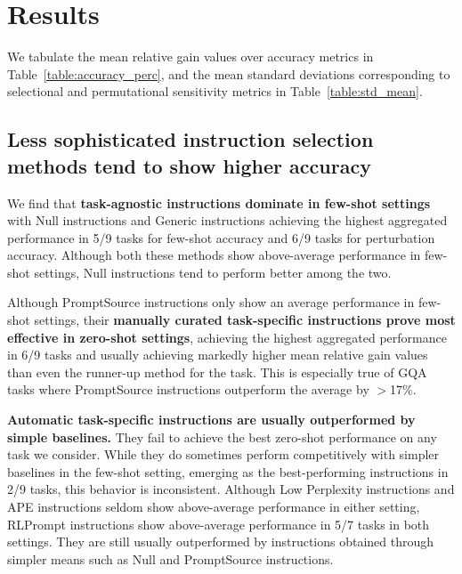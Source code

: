 \section{Results}


We tabulate the mean relative gain values over accuracy metrics in Table~\ref{table:accuracy_perc}, and the mean standard deviations corresponding to selectional and permutational sensitivity metrics in Table~\ref{table:std_mean}.

\subsection{Less sophisticated instruction selection methods tend to show higher accuracy}

We find that \textbf{task-agnostic instructions dominate in few-shot settings} with Null instructions and Generic instructions achieving the highest aggregated performance in 5/9 tasks for few-shot accuracy and 6/9 tasks for perturbation accuracy. Although both these methods show above-average performance in few-shot settings, Null instructions tend to perform better among the two.

Although PromptSource instructions only show an average performance in few-shot settings, their \textbf{manually curated task-specific instructions prove most effective in zero-shot settings}, achieving the highest aggregated performance in 6/9 tasks and usually achieving markedly higher mean relative gain values than even the runner-up method for the task. %
This is especially true of GQA tasks where PromptSource instructions outperform the average by $>$17\%.

\textbf{Automatic task-specific instructions are usually outperformed by simple baselines.} They fail to achieve the best zero-shot performance on any task we consider. While they do sometimes perform competitively with simpler baselines in the few-shot setting, emerging as the best-performing instructions in 2/9 tasks, this behavior is inconsistent. Although Low Perplexity instructions and APE instructions seldom show above-average performance in either setting, RLPrompt instructions show above-average performance in 5/7 tasks in both settings. They are still usually outperformed by instructions obtained through simpler means such as Null and PromptSource instructions.

